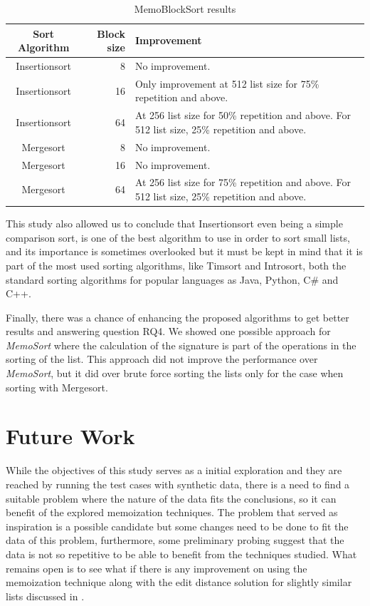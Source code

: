 \documentclass[a4paper,12pt]{article}
\begin{document}
\begin{table}[H]
\centering
\begin{tabular}{|c|r|p{80mm}|}  \hline
	{Sort Algorithm} & {Block size} & {Improvement} \\  \hline
	Insertionsort & 8 & No improvement. \\ 
	Insertionsort & 16 & Only improvement at 512 list size for 75\% repetition and above. \\ 
	Insertionsort & 64 & At  256 list size for 50\% repetition and above. For 512 list size, 25\% repetition and above.\\ 
	Mergesort & 8 &  No improvement. \\ 
	Mergesort & 16 & No improvement. \\ 
	Mergesort & 64 & At  256 list size for 75\% repetition and above. For 512 list size, 25\% repetition and above. \\  \hline
\end{tabular}
\caption{MemoBlockSort results}
\label{fig:MemoBlockSortResults}
\end{table}

This study also allowed us to conclude that Insertionsort even being a simple comparison sort, is one of the best algorithm to use in order to sort small lists, and its importance is sometimes overlooked but it must be kept in mind that it is part of the most used sorting algorithms, like Timsort and Introsort, both the standard sorting algorithms for popular languages as Java, Python, C\# and C++.

Finally, there was a chance of enhancing the proposed algorithms to get better results and answering question RQ4. We showed one possible approach for  {\it MemoSort} where the calculation of the signature is part of the operations in the sorting of the list. This approach did not improve the performance over {\it MemoSort}, but it did over brute force sorting the lists only for the case when sorting with Mergesort. \\

\section{Future Work}

While the objectives of this study serves as a initial exploration and they are reached by running the test cases with synthetic data, there is a need to find a suitable problem where the nature of the data fits the conclusions, so it can benefit of  the explored memoization techniques. The problem that served as inspiration \cite{Arch2015} is a possible candidate but some changes need to be done to fit the data of this problem, furthermore, some preliminary probing suggest that the data is not so repetitive to be able to benefit from the techniques studied. What remains open is to see what if there is any improvement on using the memoization technique along with the edit distance solution for slightly similar lists discussed in \cite{Arch2015}.
\end{document}
